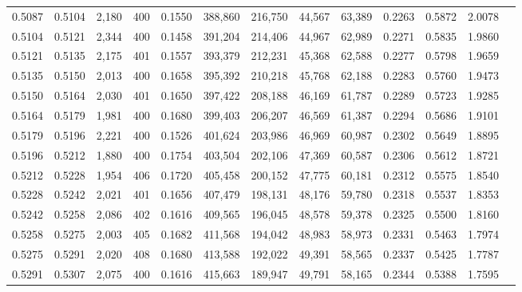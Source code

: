 \begin{tabular}{rrrrrrrrrrrrr}
0.5087 & 0.5104 &  2,180 & 400 &                                     0.1550 & 388,860 & 216,750 &  44,567 &  63,389 & 0.2263 & 0.5872 & 2.0078 \\
0.5104 & 0.5121 &  2,344 & 400 &                                     0.1458 & 391,204 & 214,406 &  44,967 &  62,989 & 0.2271 & 0.5835 & 1.9860 \\
0.5121 & 0.5135 &  2,175 & 401 &                                     0.1557 & 393,379 & 212,231 &  45,368 &  62,588 & 0.2277 & 0.5798 & 1.9659 \\
0.5135 & 0.5150 &  2,013 & 400 &                                     0.1658 & 395,392 & 210,218 &  45,768 &  62,188 & 0.2283 & 0.5760 & 1.9473 \\
0.5150 & 0.5164 &  2,030 & 401 &                                     0.1650 & 397,422 & 208,188 &  46,169 &  61,787 & 0.2289 & 0.5723 & 1.9285 \\
0.5164 & 0.5179 &  1,981 & 400 &                                     0.1680 & 399,403 & 206,207 &  46,569 &  61,387 & 0.2294 & 0.5686 & 1.9101 \\
0.5179 & 0.5196 &  2,221 & 400 &                                     0.1526 & 401,624 & 203,986 &  46,969 &  60,987 & 0.2302 & 0.5649 & 1.8895 \\
0.5196 & 0.5212 &  1,880 & 400 &                                     0.1754 & 403,504 & 202,106 &  47,369 &  60,587 & 0.2306 & 0.5612 & 1.8721 \\
0.5212 & 0.5228 &  1,954 & 406 &                                     0.1720 & 405,458 & 200,152 &  47,775 &  60,181 & 0.2312 & 0.5575 & 1.8540 \\
0.5228 & 0.5242 &  2,021 & 401 &                                     0.1656 & 407,479 & 198,131 &  48,176 &  59,780 & 0.2318 & 0.5537 & 1.8353 \\
0.5242 & 0.5258 &  2,086 & 402 &                                     0.1616 & 409,565 & 196,045 &  48,578 &  59,378 & 0.2325 & 0.5500 & 1.8160 \\
0.5258 & 0.5275 &  2,003 & 405 &                                     0.1682 & 411,568 & 194,042 &  48,983 &  58,973 & 0.2331 & 0.5463 & 1.7974 \\
0.5275 & 0.5291 &  2,020 & 408 &                                     0.1680 & 413,588 & 192,022 &  49,391 &  58,565 & 0.2337 & 0.5425 & 1.7787 \\
0.5291 & 0.5307 &  2,075 & 400 &                                     0.1616 & 415,663 & 189,947 &  49,791 &  58,165 & 0.2344 & 0.5388 & 1.7595 \\

\end{tabular}
